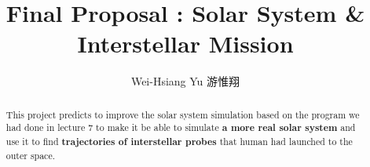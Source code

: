 \documentclass{article}
\title{Final Proposal : Solar System \& Interstellar Mission}
\author{Wei-Hsiang Yu 游惟翔}
\affil{Department of Physics, National Tsing Hua University, Hsinchu, Taiwan}
\begin{document}
\begin{CJK}{UTF8}{bsmi}
\maketitle

\end{CJK}


\begin{abstract}
    This project predicts to improve the solar system simulation based on the program we had done in lecture 7 to make it be able to simulate \textbf{a more real solar system} and use it to find \textbf{trajectories of interstellar probes} that human had launched to the outer space.
\end{abstract}
\end{document}
